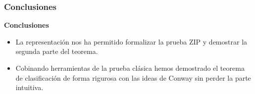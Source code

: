 \documentclass{beamer}
\newcommand{\enfatiza}[1]{\textbf{\textit{#1}}}
\theoremstyle{definition}
\begin{document}
\begin{frame}
\frametitle{Conclusiones}
\textbf{Conclusiones}
\begin{itemize}
\item La representación nos ha permitido formalizar la prueba ZIP y demostrar la segunda parte del teorema.
\item Cobinando herramientas de la prueba clásica hemos demostrado el teorema de clasificación de forma rigurosa con las ideas de Conway sin perder la parte intuitiva.
\end{itemize}

\end{frame}


%
%
%
%
%
%





\end{document}
